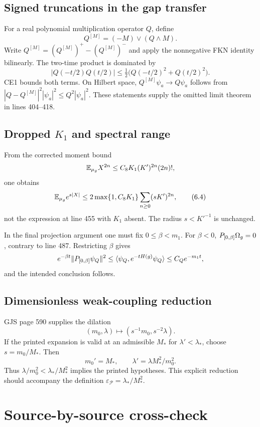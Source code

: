 \documentclass[10pt,a4paper]{article}
\begin{document}
\subsection{Signed truncations in the gap transfer}

For a real polynomial multiplication operator $Q$, define
\[
 Q^{[M]}=(-M)\vee(Q\wedge M).
\]
Write $Q^{[M]}=(Q^{[M]})^+-(Q^{[M]})^-$ and apply the nonnegative FKN identity
bilinearly.  The two-time product is dominated by
\[
 |Q(-t/2)Q(t/2)|
 \leq\tfrac12\bigl(Q(-t/2)^2+Q(t/2)^2\bigr).                       \tag{6.3}
\]
CE1 bounds both terms.  On Hilbert space,
$Q^{[M]}\psi_a\to Q\psi_a$ follows from
$|Q-Q^{[M]}|^2|\psi_a|^2\leq Q^2|\psi_a|^2$.  These statements supply the
omitted limit theorem in lines 404--418.

\subsection{Dropped \texorpdfstring{$K_1$}{K1} and spectral range}

From the corrected moment bound
\[
 \mathbb E_{\mu_g}X^{2n}\leq C_8K_1(K')^{2n}(2n)!,
\]
one obtains
\[
 \mathbb E_{\mu_g}e^{s|X|}
 \leq2\max\{1,C_8K_1\}\sum_{n\geq0}(sK')^{2n},                    \tag{6.4}
\]
not the expression at line 455 with $K_1$ absent.  The radius $s<K'^{-1}$ is
unchanged.

In the final projection argument one must fix $0\leq\beta<m_1$.  For $\beta<0$,
$P_{[0,\beta]}\Omega_g=0$, contrary to line 487.  Restricting $\beta$ gives
\[
 e^{-\beta t}\|P_{[0,\beta]}\psi_Q\|^2
 \leq\langle \psi_Q,e^{-tH(g)}\psi_Q\rangle
 \leq C_Qe^{-m_1t},
\]
and the intended conclusion follows.

\subsection{Dimensionless weak-coupling reduction}

GJS page 590 supplies the dilation
\[
 (m_0,\lambda)\mapsto(s^{-1}m_0,s^{-2}\lambda).
\]
If the printed expansion is valid at an admissible $M_*$ for
$\lambda'<\lambda_*$, choose $s=m_0/M_*$.  Then
\[
 m_0'=M_*,\qquad \lambda'=\lambda M_*^2/m_0^2.
\]
Thus $\lambda/m_0^2<\lambda_*/M_*^2$ implies the printed hypotheses.  This explicit
reduction should accompany the definition
$\varepsilon_{\mathscr P}=\lambda_*/M_*^2$.

\section{Source-by-source cross-check}
\end{document}
